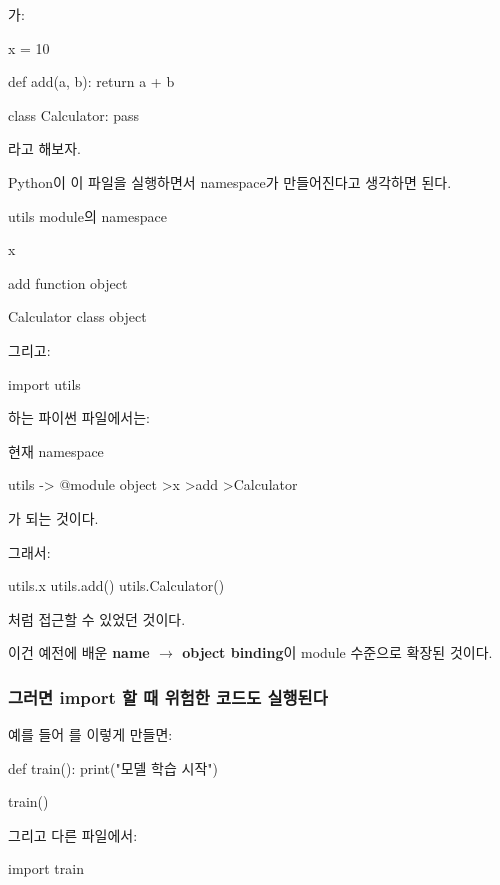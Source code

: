 가:

\begin{dhkcode}
x = 10

def add(a, b):
    return a + b

class Calculator:
    pass
\end{dhkcode}

라고 해보자.

Python이 이 파일을 실행하면서 namespace가 만들어진다고 생각하면 된다.

\begin{dhksmry}
    utils module의 namespace

    x 

    add \ra function object

    Calculator \ra class object
\end{dhksmry}

그리고:

\begin{dhkcode}
import utils
\end{dhkcode}

하는 파이썬 파일에서는:

\begin{dhkdir}
현재 namespace

utils -> @module object
>x
>add
>Calculator
\end{dhkdir}


가 되는 것이다.

그래서:

\begin{dhkcode}
utils.x
utils.add()
utils.Calculator()
\end{dhkcode}

처럼 접근할 수 있었던 것이다.

이건 예전에 배운 \textbf{name $\rightarrow$ object binding}이 module 수준으로 확장된 것이다.

\subsubsection{그러면 import 할 때 위험한 코드도 실행된다}

예를 들어 를 이렇게 만들면:

\begin{dhkcode}
def train():
    print("모델 학습 시작")

train()
\end{dhkcode}

그리고 다른 파일에서:

\begin{dhkcode}
import train
\end{dhkcode}


